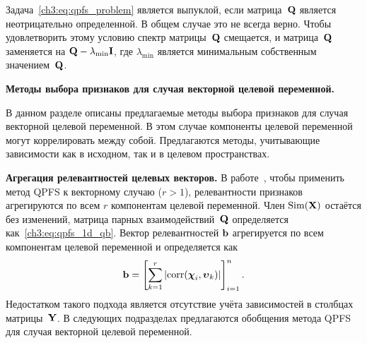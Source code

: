 \documentclass[11pt, a5paper]{dissert}
\begin{document}
Задача~\eqref{ch3:eq:qpfs_problem} является выпуклой, если матрица~$\mathbf{Q}$ является неотрицательно определенной. В общем случае это не всегда верно. 
Чтобы удовлетворить этому условию спектр матрицы~$\mathbf{Q}$ смещается, и матрица~$\mathbf{Q}$ заменяется на $\mathbf{Q} - \lambda_{\text{min}} \mathbf{I}$, где $\lambda_{\text{min}} $ является минимальным собственным значением~$\mathbf{Q}$.

\textbf{Методы выбора признаков для случая векторной целевой переменной.}
\label{sec:ch3:mqpfs_feature_selection}

В данном разделе описаны предлагаемые методы выбора признаков для случая векторной целевой переменной.
В этом случае компоненты целевой переменной могут коррелировать между собой. 
Предлагаются методы, учитывающие зависимости как в исходном, так и в целевом пространствах.

\textbf{Агрегация релевантностей целевых векторов.}
В работе~\cite{motrenko2018multi}, чтобы применить метод QPFS к векторному случаю ($r > 1$), релевантности признаков агрегируются по всем $r$ компонентам целевой переменной. 
Член $\text{Sim}(\mathbf{X})$ остаётся без изменений, матрица парных взаимодействий~$\mathbf{Q}$ определяется как~\eqref{ch3:eq:qpfs_1d_qb}. 
Вектор релевантностей $\mathbf{b}$ агрегируется по всем компонентам целевой переменной и определяется как
\begin{equation*}
	\mathbf{b} = \left[\sum_{k=1}^r|\text{corr}(\boldsymbol{\chi}_i, \boldsymbol{\upsilon}_k)|\right]_{i=1}^n.
\end{equation*}
Недостатком такого подхода является отсутствие учёта зависимостей в столбцах матрицы~$\mathbf{Y}$. 
В следующих подразделах предлагаются обобщения метода QPFS для случая векторной целевой переменной.
\end{document}

